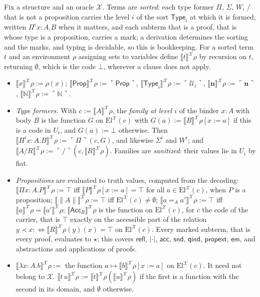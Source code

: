 \documentclass[10pt]{article}
\newcommand{\N}{\mathbb{N}}
\newcommand{\Prop}{\mathsf{Prop}}
\newcommand{\Type}{\mathsf{Type}}
\newcommand{\sem}[1]{\llbracket #1\rrbracket}
\newcommand{\El}{\mathrm{El}}
\newcommand{\code}[1]{\ulcorner #1\urcorner}
\newcommand{\U}{\mathcal{U}}
\newcommand{\X}{\mathcal{X}}
\newcommand{\Acc}{\mathsf{Acc}}
\newcommand{\refl}{\mathsf{refl}}
\begin{document}
\begin{definition}[evaluation]\label{def:eval}
Fix a structure and an oracle $\X$. Terms are \emph{sorted}: each type
former $\Pi$, $\Sigma$, $W$, $/$ that is not a proposition carries the
level $i$ of the sort $\Type_i$ at which it is formed, written
$\Pi^ix{:}A.B$ when it matters, and each subterm that is a proof, that is
whose type is a proposition, carries a mark; a derivation determines
the sorting and the marks, and typing is decidable, so this is
bookkeeping. For a sorted term $t$ and an environment $\rho$ assigning sets to variables
define $\sem t^\X\rho$ by recursion on $t$, returning $\emptyset$, which
is the code $\bot$, wherever a clause does not apply.
\begin{itemize}
\item $\sem x^\X\rho:=\rho(x)$; $\sem\Prop^\X\rho:=\code\Prop$,
  $\sem{\Type_i}^\X\rho:=\code{\U_i}$, $\sem{\mathbf n}^\X\rho:=\code{\mathbf n}$,
  $\sem\N^\X\rho:=\code\N$.
\item \emph{Type formers.} With $c:=\sem A^\X\rho$, the \emph{family at
  level $i$} of the binder $x{:}A$ with body $B$ is the function $G$ on
  $\El^\X(c)$ with $G(a):=\sem B^\X\rho[x{:=}a]$ if this is a code in $U_i$,
  and $G(a):=\bot$ otherwise. Then
  $\sem{\Pi^ix{:}A.B}^\X\rho:=\code\Pi(c,G)$, and likewise $\Sigma^i$ and
  $W^i$; and $\sem{A/R}^\X\rho:=\code/(c,\sem R^\X\rho)$. Families are
  \emph{sanitized}: their values lie in $U_i$ by fiat.
\item \emph{Propositions} are evaluated to truth values, computed from
  the decoding:
  $\sem{\Pi x{:}A.P}^\X\rho:=\top$ iff $\sem P^\X\rho[x{:=}a]=\top$ for
  all $a\in\El^\X(c)$, when $P$ is a proposition;
  $\sem{\|A\|}^\X\rho:=\top$ iff $\El^\X(c)\ne\emptyset$;
  $\sem{a=_Aa'}^\X\rho:=\top$ iff $\sem a^\X\rho=\sem{a'}^\X\rho$;
  $\sem{\Acc_R}^\X\rho$ is the function on $\El^\X(c)$, for $c$ the code of
  the carrier, that is $\top$ exactly on the accessible part of the
  relation $y\prec x:\iff\sem R^\X\rho(y)(x)=\top$ on $\El^\X(c)$.
  Every marked subterm, that is every proof, evaluates to $\star$; this
  covers $\refl$, $|{\cdot}|$, $\mathsf{acc}$, $\mathsf{snd}$,
  $\mathsf{qind}$, $\mathsf{propext}$, $\mathsf{em}$, and abstractions and
  applications of proofs.
\item $\sem{\lambda x{:}A.b}^\X\rho:=$ the function
  $a\mapsto\sem b^\X\rho[x{:=}a]$ on $\El^\X(c)$. It need not belong to
  $\X$. $\sem{t\,u}^\X\rho:=\sem t^\X\rho(\sem u^\X\rho)$ if the first is a
  function with the second in its domain, and $\emptyset$ otherwise.

\end{itemize}
\end{definition}
\end{document}

